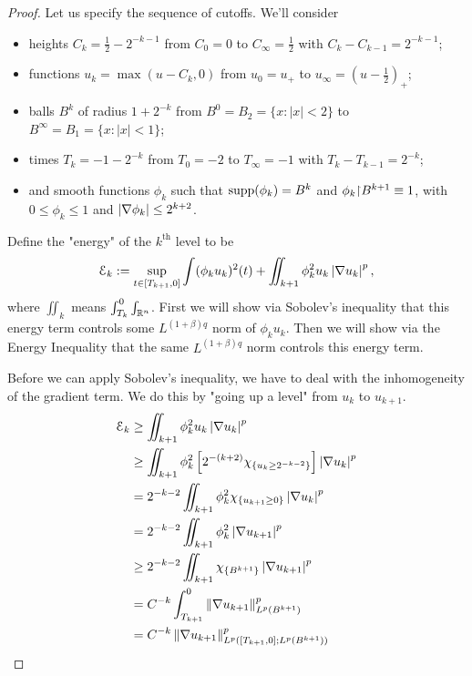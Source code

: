 \begin{proof}
Let us specify the sequence of cutoffs.  We'll consider 
\begin{itemize}
\item heights $C_k = \frac{1}{2}-2^{-k-1}$ from $C_0 = 0$ to $C_\infty = \frac{1}{2}$ with $C_k - C_{k-1} = 2^{-k-1}$; 
\item functions $u_k = \max(u-C_k,0)$ from $u_0 = u_+$ to $u_\infty = (u-\frac{1}{2})_+$;
\item balls $B^k$ of radius $1 + 2^{-k}$ from $B^0 = B_2 = \{x: |x|<2\}$ to $B^\infty = B_1 = \{x:|x|<1\}$; 
\item times $T_k = -1-2^{-k}$ from $T_0 = -2$ to $T_\infty = -1$ with $T_k - T_{k-1} = 2^{-k}$; 
\item and smooth functions $\phi_k$ such that $\operatorname{supp}(\phi_k) = B^k$ and $\phi_k {\upharpoonright} B^{k+1} \equiv 1$, with $0 \leq \phi_k \leq 1$ and $\left\lvert \nabla \phi_k \right\rvert \leq 2^{k+2}$.  
\end{itemize}

Define the "energy" of the $k^\textrm{th}$ level to be
\[ \mathcal{E}_k := \sup_{t \in [T_{k+1},0]} \int (\phi_k u_k)^2(t) + \iint_{k+1} \phi_k^2 u_k \left\lvert \nabla u_k \right\rvert^p,\]  
where $\iint_k$ means $\int_{T_k}^0 \int_{\mathbb{R}^n}$.  First we will show via Sobolev's inequality that this energy term controls some $L^{(1+\beta)q}$ norm of $\phi_k u_k$.  Then we will show via the Energy Inequality that the same $L^{(1+\beta)q}$ norm controls this energy term.  


Before we can apply Sobolev's inequality, we have to deal with the inhomogeneity of the gradient term.  We do this by "going up a level" from $u_k$ to $u_{k+1}$.  
\begin{align*}
\mathcal{E}_k &\geq \iint_{k+1} \phi_k^2 u_k \left\lvert \nabla u_k \right\rvert^p 
\\ &\geq \iint_{k+1} \phi_k^2 \left[ 2^{-(k+2)} \chi_{\{u_k \geq 2^{-k-2}\}} \right] \left\lvert \nabla u_k \right\rvert^p
\\ &= 2^{-k-2}\iint_{k+1} \phi_k^2 \chi_{\{u_{k+1} \geq 0\}} \left\lvert \nabla u_k \right\rvert^p
\\ &= 2^{-k-2}\iint_{k+1} \phi_k^2 \left\lvert \nabla u_{k+1} \right\rvert^p
\\&\geq 2^{-k-2}\iint_{k+1} \chi_{\{B^{k+1}\}} \left\lvert \nabla u_{k+1} \right\rvert^p
\\&= C^{-k} \int_{T_{k+1}}^0 \left\lVert\nabla u_{k+1}\right\rVert_{L^p(B^{k+1})}^p
\\&= C^{-k} \left\lVert\nabla u_{k+1}\right\rVert_{L^p([T_{k+1},0];L^p(B^{k+1}))}^p
\end{align*}


\end{proof}
